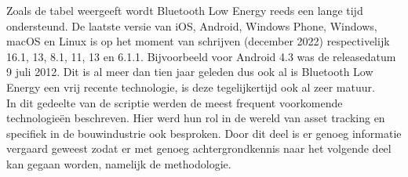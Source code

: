 Zoals de tabel weergeeft wordt Bluetooth Low Energy reeds een lange tijd ondersteund. De laatste versie van iOS, Android, Windows Phone, Windows, macOS en Linux is op het moment van schrijven (december 2022) respectivelijk 16.1, 13, 8.1, 11, 13 en 6.1.1. Bijvoorbeeld voor Android 4.3 was de releasedatum 9 juli 2012. Dit is al meer dan tien jaar geleden dus ook al is Bluetooth Low Energy een vrij recente technologie, is deze tegelijkertijd ook al zeer matuur.\\

In dit gedeelte van de scriptie werden de meest frequent voorkomende technologieën beschreven. Hier werd hun rol in de wereld van asset tracking en specifiek in de bouwindustrie ook besproken. Door dit deel is er genoeg informatie vergaard geweest zodat er met genoeg achtergrondkennis naar het volgende deel kan gegaan worden, namelijk de methodologie.